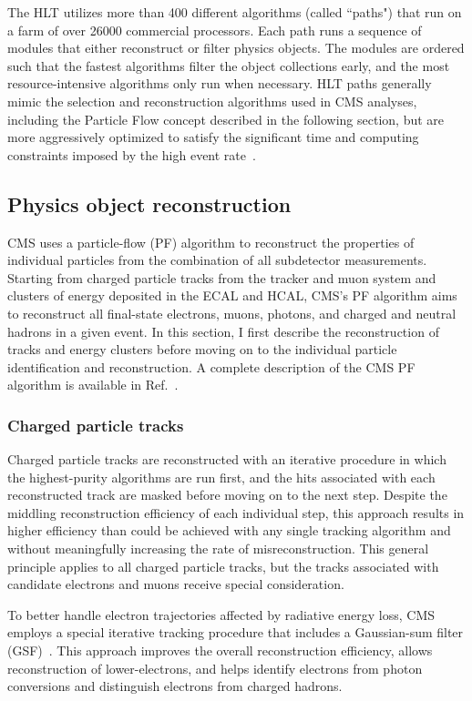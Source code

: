 The HLT utilizes more than 400 different algorithms (called ``paths") that run on a farm of over \num{26000} commercial processors. Each path runs a sequence of modules that either reconstruct or filter physics objects. The modules are ordered such that the fastest algorithms filter the object collections early, and the most resource-intensive algorithms only run when necessary. HLT paths generally mimic the selection and reconstruction algorithms used in CMS analyses, including the Particle Flow concept described in the following section, but are more aggressively optimized to satisfy the significant time and computing constraints imposed by the high event rate~\cite{trigger_run2}.

\subsection{Physics object reconstruction}
\label{cms_reco}
CMS uses a particle-flow (PF) algorithm to reconstruct the properties of individual particles from the combination of all subdetector measurements. Starting from charged particle tracks from the tracker and muon system and clusters of energy deposited in the ECAL and HCAL, CMS's PF algorithm aims to reconstruct all final-state electrons, muons, photons, and charged and neutral hadrons in a given event. In this section, I first describe the reconstruction of tracks and energy clusters before moving on to the individual particle identification and reconstruction. A complete description of the CMS PF algorithm is available in Ref.~\cite{cms_pf}.

\subsubsection{Charged particle tracks}
Charged particle tracks are reconstructed with an iterative procedure in which the highest-purity algorithms are run first, and the hits associated with each reconstructed track are masked before moving on to the next step. Despite the middling reconstruction efficiency of each individual step, this approach results in higher efficiency than could be achieved with any single tracking algorithm and without meaningfully increasing the rate of misreconstruction. This general principle applies to all charged particle tracks, but the tracks associated with candidate electrons and muons receive special consideration.

To better handle electron trajectories affected by radiative energy loss, CMS employs a special iterative tracking procedure that includes a Gaussian-sum filter (GSF)~\cite{gsf}. This approach improves the overall reconstruction efficiency, allows reconstruction of lower-\pt electrons, and helps identify electrons from photon conversions and distinguish electrons from charged hadrons.

